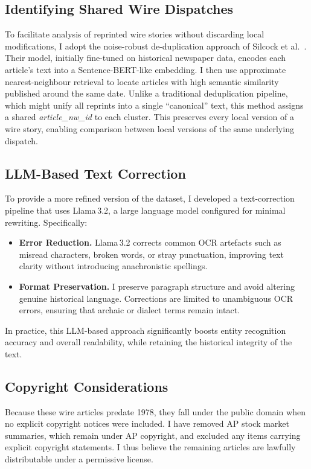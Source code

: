 \documentclass{article}
\begin{document}
\subsection{Identifying Shared Wire Dispatches}
To facilitate analysis of reprinted wire stories without discarding local modifications, I adopt the noise-robust de-duplication approach of Silcock et al.~\cite{silcock2023noise}. Their model, initially fine-tuned on historical newspaper data, encodes each article's text into a Sentence-BERT-like embedding. I then use approximate nearest-neighbour retrieval to locate articles with high semantic similarity published around the same date. Unlike a traditional deduplication pipeline, which might unify all reprints into a single “canonical” text, this method assigns a shared \textit{article\_nw\_id} to each cluster. This preserves every local version of a wire story, enabling comparison between local versions of the same underlying dispatch.

\subsection{LLM-Based Text Correction}
To provide a more refined version of the dataset, I developed a text-correction pipeline that uses Llama\,3.2, a large language model configured for minimal rewriting. Specifically:
\begin{itemize}
    \item \textbf{Error Reduction.} Llama\,3.2 corrects common OCR artefacts such as misread characters, broken words, or stray punctuation, improving text clarity without introducing anachronistic spellings.
    \item \textbf{Format Preservation.} I preserve paragraph structure and avoid altering genuine historical language. Corrections are limited to unambiguous OCR errors, ensuring that archaic or dialect terms remain intact.
\end{itemize}
In practice, this LLM-based approach significantly boosts entity recognition accuracy and overall readability, while retaining the historical integrity of the text.

\subsection{Copyright Considerations}
Because these wire articles predate 1978, they fall under the public domain when no explicit copyright notices were included. I have removed AP stock market summaries, which remain under AP copyright, and excluded any items carrying explicit copyright statements. I thus believe the remaining articles are lawfully distributable under a permissive license.
\end{document}
